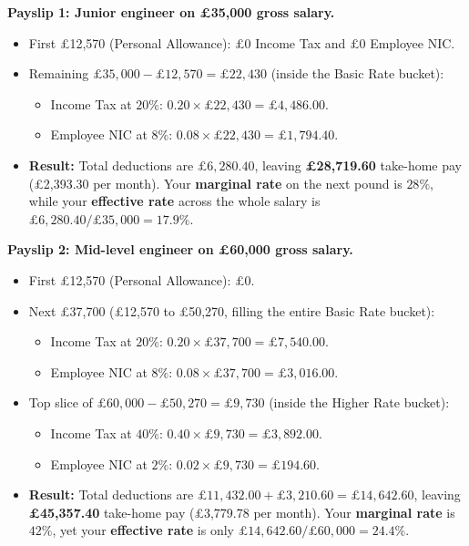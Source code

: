 \textbf{Payslip 1: Junior engineer on \pounds 35,000 gross salary.}
\begin{itemize}
  \item First \pounds 12,570 (Personal Allowance): $\pounds 0$ Income Tax and $\pounds 0$ Employee NIC.
  \item Remaining $\pounds 35{,}000 - \pounds 12{,}570 = \pounds 22{,}430$ (inside the Basic Rate bucket):
  \begin{itemize}
    \item Income Tax at $20\%$: $0.20 \times \pounds 22{,}430 = \pounds 4{,}486.00$.
    \item Employee NIC at $8\%$: $0.08 \times \pounds 22{,}430 = \pounds 1{,}794.40$.
  \end{itemize}
  \item \textbf{Result:} Total deductions are $\pounds 6{,}280.40$, leaving \textbf{\pounds 28,719.60} take-home pay (\pounds 2,393.30 per month). Your \textbf{marginal rate} on the next pound is \textbf{$28\%$}, while your \textbf{effective rate} across the whole salary is $\pounds 6{,}280.40 / \pounds 35{,}000 = \mathbf{17.9\%}$.
\end{itemize}

\textbf{Payslip 2: Mid-level engineer on \pounds 60,000 gross salary.}
\begin{itemize}
  \item First \pounds 12,570 (Personal Allowance): $\pounds 0$.
  \item Next \pounds 37,700 (\pounds 12,570 to \pounds 50,270, filling the entire Basic Rate bucket):
  \begin{itemize}
    \item Income Tax at $20\%$: $0.20 \times \pounds 37{,}700 = \pounds 7{,}540.00$.
    \item Employee NIC at $8\%$: $0.08 \times \pounds 37{,}700 = \pounds 3{,}016.00$.
  \end{itemize}
  \item Top slice of $\pounds 60{,}000 - \pounds 50{,}270 = \pounds 9{,}730$ (inside the Higher Rate bucket):
  \begin{itemize}
    \item Income Tax at $40\%$: $0.40 \times \pounds 9{,}730 = \pounds 3{,}892.00$.
    \item Employee NIC at $2\%$: $0.02 \times \pounds 9{,}730 = \pounds 194.60$.
  \end{itemize}
  \item \textbf{Result:} Total deductions are $\pounds 11{,}432.00 + \pounds 3{,}210.60 = \pounds 14{,}642.60$, leaving \textbf{\pounds 45,357.40} take-home pay (\pounds 3,779.78 per month). Your \textbf{marginal rate} is \textbf{$42\%$}, yet your \textbf{effective rate} is only $\pounds 14{,}642.60 / \pounds 60{,}000 = \mathbf{24.4\%}$.
\end{itemize}


